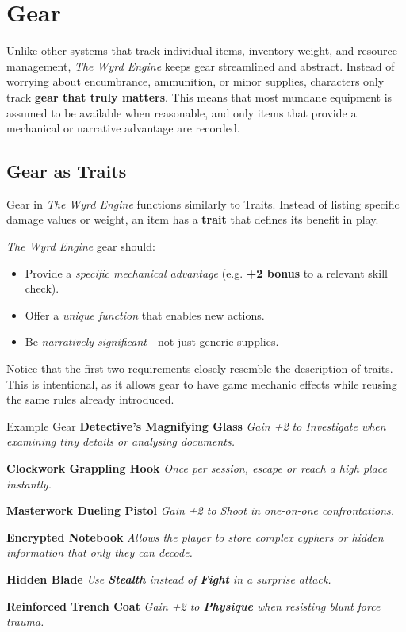 \section{Gear}

Unlike other systems that track individual items, inventory weight, and resource management, \emph{The Wyrd Engine} keeps gear streamlined and abstract. Instead of worrying about encumbrance, ammunition, or minor supplies, characters only track \textbf{gear that truly matters}. This means that most mundane equipment is assumed to be available when reasonable, and only items that provide a mechanical or narrative advantage are recorded.

\subsection{Gear as Traits}
Gear in \emph{The Wyrd Engine} functions similarly to Traits. Instead of listing specific damage values or weight, an item has a \textbf{trait} that defines its benefit in play. 

\emph{The Wyrd Engine} gear should:
\begin{itemize}
    \item Provide a \emph{specific mechanical advantage} (e.g. \textbf{+2 bonus} to a relevant skill check).
    \item Offer a \emph{unique function} that enables new actions.
    \item Be \emph{narratively significant}—not just generic supplies.
\end{itemize}

Notice that the first two requirements closely resemble the description of traits. This is intentional, as it allows gear to have game mechanic effects while reusing the same rules already introduced.

\begin{DndSidebar}[float=!b]{Example Gear}
	\textbf{Detective’s Magnifying Glass}  
	\emph{Gain +2 to Investigate when examining tiny details or analysing documents.}

	\textbf{Clockwork Grappling Hook}  
	\emph{Once per session, escape or reach a high place instantly.}

	\textbf{Masterwork Dueling Pistol}  
	\emph{Gain +2 to Shoot in one-on-one confrontations.}

	\textbf{Encrypted Notebook}  
	\emph{Allows the player to store complex cyphers or hidden information that only they can decode.}

	\textbf{Hidden Blade}  
	\emph{Use \textbf{Stealth} instead of \textbf{Fight} in a surprise attack.}

	\textbf{Reinforced Trench Coat}  
	\emph{Gain +2 to \textbf{Physique} when resisting blunt force trauma.}
\end{DndSidebar}


